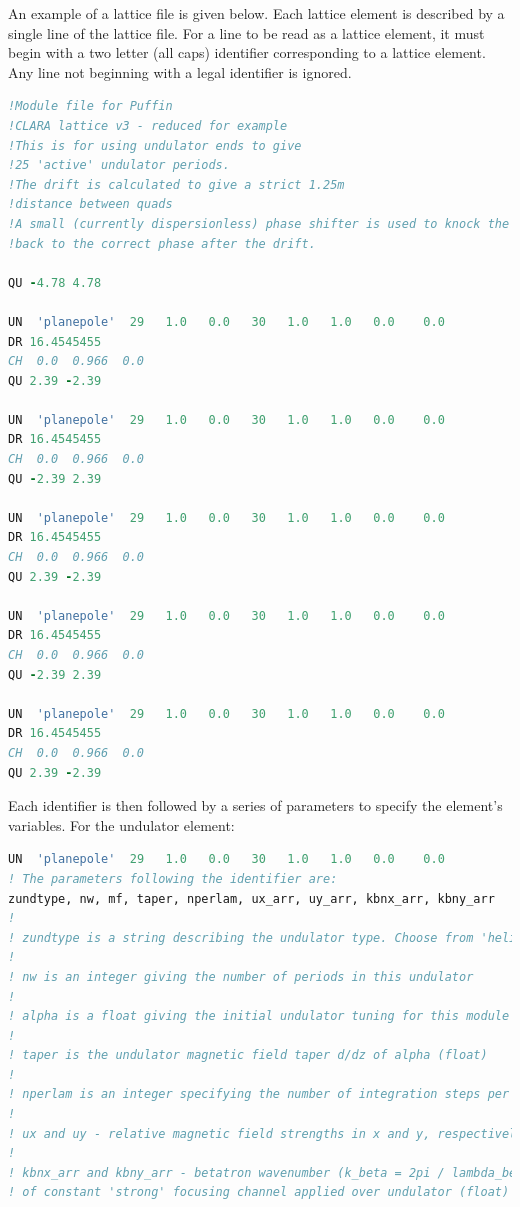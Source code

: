 \documentclass[12pt]{article}%
\begin{document}
An example of a lattice file is given below. Each lattice element is described by a single line of the lattice file. For a line to be read as a lattice element, it must begin with a two letter (all caps) identifier corresponding to a lattice element. Any line not beginning with a legal identifier is ignored.

\lstset{style=mystyle}
\begin{lstlisting}[language=fortran, caption=Example lattice file.]
!Module file for Puffin
!CLARA lattice v3 - reduced for example
!This is for using undulator ends to give
!25 'active' undulator periods.
!The drift is calculated to give a strict 1.25m
!distance between quads
!A small (currently dispersionless) phase shifter is used to knock the beam
!back to the correct phase after the drift.

QU -4.78 4.78

UN  'planepole'  29   1.0   0.0   30   1.0   1.0   0.0    0.0
DR 16.4545455
CH  0.0  0.966  0.0
QU 2.39 -2.39

UN  'planepole'  29   1.0   0.0   30   1.0   1.0   0.0    0.0
DR 16.4545455
CH  0.0  0.966  0.0
QU -2.39 2.39

UN  'planepole'  29   1.0   0.0   30   1.0   1.0   0.0    0.0
DR 16.4545455
CH  0.0  0.966  0.0
QU 2.39 -2.39

UN  'planepole'  29   1.0   0.0   30   1.0   1.0   0.0    0.0
DR 16.4545455
CH  0.0  0.966  0.0
QU -2.39 2.39

UN  'planepole'  29   1.0   0.0   30   1.0   1.0   0.0    0.0
DR 16.4545455
CH  0.0  0.966  0.0
QU 2.39 -2.39

\end{lstlisting}

Each identifier is then followed by a series of parameters to specify the element's variables. For the undulator element:

\begin{lstlisting}[language=fortran, caption=Undulator identifier and specification]
UN  'planepole'  29   1.0   0.0   30   1.0   1.0   0.0    0.0
! The parameters following the identifier are:
zundtype, nw, mf, taper, nperlam, ux_arr, uy_arr, kbnx_arr, kbny_arr
!
! zundtype is a string describing the undulator type. Choose from 'helical', 'planepole', 'curved', or '' (blank string)
!
! nw is an integer giving the number of periods in this undulator
!
! alpha is a float giving the initial undulator tuning for this module aw/aw0,
!
! taper is the undulator magnetic field taper d/dz of alpha (float)
!
! nperlam is an integer specifying the number of integration steps per undulator period to be used in this undulator
!
! ux and uy - relative magnetic field strengths in x and y, respectively (float)
!
! kbnx_arr and kbny_arr - betatron wavenumber (k_beta = 2pi / lambda_beta)
! of constant 'strong' focusing channel applied over undulator (float)
\end{lstlisting}
\end{document}
